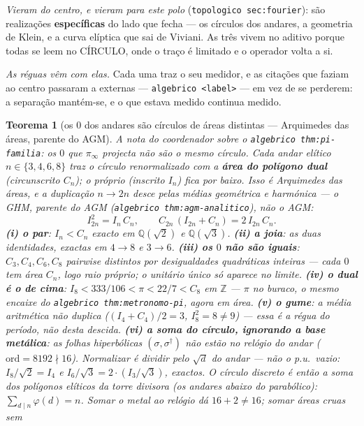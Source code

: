 \documentclass[11pt,a4paper]{article}
\newtheorem{teorema}{Teorema}
\newcommand{\code}[1]{\texttt{#1}}
\begin{document}
\noindent\emph{Vieram do centro, e vieram para este polo} (\code{topologico sec:fourier}):
são realizações \textbf{específicas} do lado que fecha --- os círculos dos andares, a
geometria de Klein, e a curva elíptica que sai de Viviani. As três vivem no aditivo porque
todas se leem no CÍRCULO, onde o traço é limitado e o operador volta a si.

\emph{As réguas vêm com elas.} Cada uma traz o seu medidor, e as citações que faziam ao
centro passaram a externas --- \code{algebrico <label>} --- em vez de se perderem: a
separação mantém-se, e o que estava medido continua medido.

\begin{teorema}[os $0$ dos andares são círculos de áreas distintas ---
Arquimedes das áreas, parente do AGM]\label{thm:area-andares}
A nota do coordenador sobre o \code{algebrico thm:pi-familia}: os $0$ que
$\pi_{\infty}$ projecta \emph{não são o mesmo círculo}. Cada andar
elítico $n\in\{3,4,6,8\}$ traz o círculo renormalizado com a
\textbf{área do polígono dual} (circunscrito $C_{n}$); o próprio
(inscrito $I_{n}$) fica por baixo. Isso é Arquimedes das áreas, e a
duplicação $n\to 2n$ desce pelas médias \emph{geométrica} e
\emph{harmónica} --- o GHM, parente do AGM (\code{algebrico thm:agm-analitico}),
não o AGM:
\[
I_{2n}^{2}=I_{n}\,C_{n},\qquad
C_{2n}\,(I_{2n}+C_{n})=2\,I_{2n}\,C_{n}.
\]
\textbf{(i) o par}: $I_{n}<C_{n}$ exacto em $\mathbb{Q}(\sqrt2)$ e
$\mathbb{Q}(\sqrt3)$.
\textbf{(ii) a joia}: as duas identidades, exactas em $4\to8$ e
$3\to6$.
\textbf{(iii) os $0$ não são iguais}: $C_{3},C_{4},C_{6},C_{8}$
pairwise distintos por desigualdades quadráticas inteiras --- cada $0$
tem área $C_{n}$, logo raio próprio; o unitário único só aparece no
limite.
\textbf{(iv) o dual é o de cima}: $I_{8}<333/106<\pi<22/7<C_{8}$ em
$\mathbb{Z}$ --- $\pi$ no buraco, o mesmo encaixe do
\code{algebrico thm:metronomo-pi}, agora em área.
\textbf{(v) o gume}: a média aritmética \emph{não} duplica
($(I_{4}+C_{4})/2=3$, $I_{8}^{2}=8\neq9$) --- essa é a régua do
período, não desta descida.
\textbf{(vi) a soma do círculo, ignorando a base metálica}: as folhas
hiperbólicas $(\sigma,\sigma^{\dagger})$ \emph{não} estão no relógio
do andar ($\mathrm{ord}=8192\nmid 16$). Normalizar é dividir pelo
$\sqrt{d}$ do andar --- não o p.u.\ vazio:
$I_{8}/\sqrt2=I_{4}$ e $I_{6}/\sqrt3=2\cdot(I_{3}/\sqrt3)$, exactos.
O círculo discreto é então a soma dos polígonos \emph{elíticos} da
torre divisora (os andares abaixo do parabólico):
$\sum_{d\mid n}\varphi(d)=n$.
Somar o metal ao relógio dá $16+2\neq16$; somar áreas cruas sem

\end{teorema}
\end{document}
